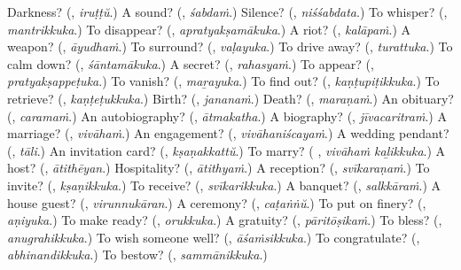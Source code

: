 \begin{tcolorbox}[breakable,colback=teal!4,colframe=teal!35!black,title={Before you move on}]
Darkness? (\textbf{}, \emph{iruṭṭŭ}.) A sound? (\textbf{}, \emph{śabdaṁ}.) Silence? (\textbf{}, \emph{niśśabdata}.) To whisper? (\textbf{}, \emph{mantrikkuka}.) To disappear? (\textbf{}, \emph{apratyakṣamākuka}.) A riot? (\textbf{}, \emph{kalāpaṁ}.) A weapon? (\textbf{}, \emph{āyudhaṁ}.) To surround? (\textbf{}, \emph{vaḷayuka}.) To drive away? (\textbf{}, \emph{turattuka}.) To calm down? (\textbf{}, \emph{śāntamākuka}.) A secret? (\textbf{}, \emph{rahasyaṁ}.) To appear? (\textbf{}, \emph{pratyakṣappeṭuka}.) To vanish? (\textbf{}, \emph{maṟayuka}.) To find out? (\textbf{}, \emph{kaṇṭupiṭikkuka}.) To retrieve? (\textbf{}, \emph{kaṇṭeṭukkuka}.) Birth? (\textbf{}, \emph{jananaṁ}.) Death? (\textbf{}, \emph{maraṇaṁ}.) An obituary? (\textbf{}, \emph{caramaṁ}.) An autobiography? (\textbf{}, \emph{ātmakatha}.) A biography? (\textbf{}, \emph{jīvacaritraṁ}.) A marriage? (\textbf{}, \emph{vivāhaṁ}.) An engagement? (\textbf{}, \emph{vivāhaniścayaṁ}.) A wedding pendant? (\textbf{}, \emph{tāli}.) An invitation card? (\textbf{}, \emph{kṣaṇakkattŭ}.) To marry? (\textbf{ }, \emph{vivāhaṁ kaḻikkuka}.) A host? (\textbf{}, \emph{ātithēyan}.) Hospitality? (\textbf{}, \emph{ātithyaṁ}.) A reception? (\textbf{}, \emph{svīkaraṇaṁ}.) To invite? (\textbf{}, \emph{kṣaṇikkuka}.) To receive? (\textbf{}, \emph{svīkarikkuka}.) A banquet? (\textbf{}, \emph{salkkāraṁ}.) A house guest? (\textbf{}, \emph{virunnukāran}.) A ceremony? (\textbf{}, \emph{caṭaṅṅŭ}.) To put on finery? (\textbf{}, \emph{aṇiyuka}.) To make ready? (\textbf{}, \emph{orukkuka}.) A gratuity? (\textbf{}, \emph{pāritōṣikaṁ}.) To bless? (\textbf{}, \emph{anugrahikkuka}.) To wish someone well? (\textbf{}, \emph{āśaṁsikkuka}.) To congratulate? (\textbf{}, \emph{abhinandikkuka}.) To bestow? (\textbf{}, \emph{sammānikkuka}.)
\end{tcolorbox}
